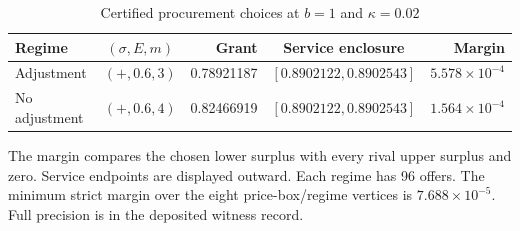 \begin{table}[tbp]
\centering
\caption{Certified procurement choices at $b=1$ and $\kappa=0.02$}\label{tab:r12_procurement}
\begin{tabular}{lcrcr}
\toprule
Regime & $(\sigma,E,m)$ & Grant & Service enclosure & Margin \\
\midrule
Adjustment & $(+, 0.6, 3)$ & 0.78921187 & $[0.8902122, 0.8902543]$ & $5.578\times10^{-4}$ \\
No adjustment & $(+, 0.6, 4)$ & 0.82466919 & $[0.8902122, 0.8902543]$ & $1.564\times10^{-4}$ \\
\bottomrule
\end{tabular}
\par\smallskip
{\footnotesize The margin compares the chosen lower surplus with every rival upper surplus and zero. Service endpoints are displayed outward. Each regime has 96 offers. The minimum strict margin over the eight price-box/regime vertices is $7.688\times10^{-5}$. Full precision is in the deposited witness record.}
\end{table}
